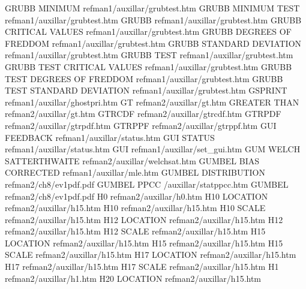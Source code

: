 GRUBB MINIMUM                           refman1/auxillar/grubtest.htm
GRUBB MINIMUM TEST                      refman1/auxillar/grubtest.htm
GRUBB                                   refman1/auxillar/grubtest.htm
GRUBB CRITICAL VALUES                   refman1/auxillar/grubtest.htm
GRUBB DEGREES OF FREDDOM                refman1/auxillar/grubtest.htm
GRUBB STANDARD DEVIATION                refman1/auxillar/grubtest.htm
GRUBB TEST                              refman1/auxillar/grubtest.htm
GRUBB TEST CRITICAL VALUES              refman1/auxillar/grubtest.htm
GRUBB TEST DEGREES OF FREDDOM           refman1/auxillar/grubtest.htm
GRUBB TEST STANDARD DEVIATION           refman1/auxillar/grubtest.htm
GSPRINT                                 refman1/auxillar/ghostpri.htm
GT                                      refman2/auxillar/gt.htm
GREATER THAN                            refman2/auxillar/gt.htm
GTRCDF                                  refman2/auxillar/gtrcdf.htm
GTRPDF                                  refman2/auxillar/gtrpdf.htm
GTRPPF                                  refman2/auxillar/gtrppf.htm
GUI FEEDBACK                            refman1/auxillar/status.htm
GUI STATUS                              refman1/auxillar/status.htm
GUI                                     refman1/auxillar/set_gui.htm
GUM WELCH SATTERTHWAITE                 refman2/auxillar/welchsat.htm
GUMBEL BIAS CORRECTED                   refman1/auxillar/mle.htm
GUMBEL DISTRIBUTION                     refman2/ch8/ev1pdf.pdf
GUMBEL PPCC                             /auxillar/statppcc.htm
GUMBEL                                  refman2/ch8/ev1pdf.pdf
H0                                      refman2/auxillar/h0.htm
H10 LOCATION                            refman2/auxillar/h15.htm
H10                                     refman2/auxillar/h15.htm
H10 SCALE                               refman2/auxillar/h15.htm
H12 LOCATION                            refman2/auxillar/h15.htm
H12                                     refman2/auxillar/h15.htm
H12 SCALE                               refman2/auxillar/h15.htm
H15 LOCATION                            refman2/auxillar/h15.htm
H15                                     refman2/auxillar/h15.htm
H15 SCALE                               refman2/auxillar/h15.htm
H17 LOCATION                            refman2/auxillar/h15.htm
H17                                     refman2/auxillar/h15.htm
H17 SCALE                               refman2/auxillar/h15.htm
H1                                      refman2/auxillar/h1.htm
H20 LOCATION                            refman2/auxillar/h15.htm
